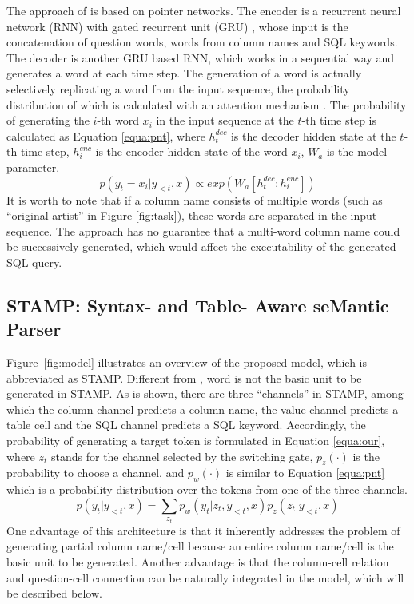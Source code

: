 \documentclass[11pt,a4paper]{article}
\begin{document}
The approach of  is based on pointer networks.
The encoder is a \mbox{recurrent} neural network (RNN) with gated recurrent unit (GRU) \cite{cho-EtAl:2014:EMNLP2014}, whose input is the concatenation of question words, words from column names and SQL keywords.
The decoder is another GRU based RNN, which works in a sequential way and generates a word at each time step.
The generation of a word is actually selectively replicating a word from the input sequence, the probability distribution
of which is calculated with an attention mechanism \cite{Bahdanau2015}.
The probability of generating the $i$-th word $x_i$ in the input sequence at the $t$-th time step is calculated as Equation \ref{equa:pnt}, where $h^{dec}_t$ is the decoder hidden state at the $t$-th time step, $h^{enc}_i$ is the encoder hidden state of the word $x_i$, $W_a$ is the model parameter.
\begin{equation}\label{equa:pnt}
p(y_t=x_i| y_{<t}, x) \propto exp(W_a [h^{dec}_t ; h^{enc}_i])
\end{equation}
It is worth to note that if a column name consists of multiple words (such as ``original artist'' in Figure \ref{fig:task}), these words are separated in the input sequence.
The approach has no guarantee that a multi-word column name could be successively generated,
which would affect the executability of the generated SQL query.





\subsection{{STAMP}: Syntax- and Table- Aware seMantic Parser }
\label{sec:framework}
Figure~\ref{fig:model} illustrates an overview of the proposed model, which is abbreviated as STAMP.
Different from , word is not the basic unit to be generated in STAMP.
As is shown, there are three ``channels'' in STAMP, among which the column channel predicts a column name, the value channel predicts a table cell and the SQL channel predicts a SQL keyword.
Accordingly, the probability of generating a target token is formulated in Equation \ref{equa:our}, where $z_t$ stands for the channel selected by the switching gate, $p_z(\cdot)$ is the probability to choose a channel, and $p_w(\cdot)$ is similar to Equation \ref{equa:pnt} which is a probability distribution over the tokens from one of the three channels.
\begin{equation}\label{equa:our}
p(y_t| y_{<t}, x) = \sum_{z_t} p_w(y_t | z_t, y_{<t}, x) p_z(z_t| y_{<t}, x)
\end{equation}
One advantage of this architecture is that it inherently addresses the problem of generating partial column name/cell because an entire column name/cell is the basic unit to be generated.
Another advantage is that the column-cell relation and question-cell connection
can be naturally integrated in the model, which will be described below.
\end{document}
